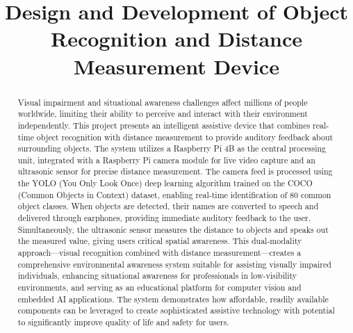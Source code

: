 \documentclass[conference]{IEEEtran}
\begin{document}
\title{Design and Development of Object Recognition and Distance Measurement Device\\}

\author{
\and
{}
}

\maketitle

\begin{abstract}
Visual impairment and situational awareness challenges affect millions of people worldwide, limiting their ability to perceive and interact with their environment independently. This project presents an intelligent assistive device that combines real-time object recognition with distance measurement to provide auditory feedback about surrounding objects. The system utilizes a Raspberry Pi 4B as the central processing unit, integrated with a Raspberry Pi camera module for live video capture and an ultrasonic sensor for precise distance measurement. The camera feed is processed using the YOLO (You Only Look Once) deep learning algorithm trained on the COCO (Common Objects in Context) dataset, enabling real-time identification of 80 common object classes. When objects are detected, their names are converted to speech and delivered through earphones, providing immediate auditory feedback to the user. Simultaneously, the ultrasonic sensor measures the distance to objects and speaks out the measured value, giving users critical spatial awareness. This dual-modality approach—visual recognition combined with distance measurement—creates a comprehensive environmental awareness system suitable for assisting visually impaired individuals, enhancing situational awareness for professionals in low-visibility environments, and serving as an educational platform for computer vision and embedded AI applications. The system demonstrates how affordable, readily available components can be leveraged to create sophisticated assistive technology with potential to significantly improve quality of life and safety for users.
\end{abstract}
\end{document}
